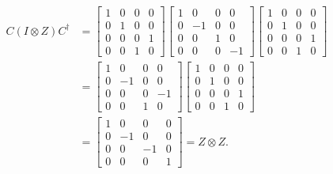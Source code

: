 \documentclass[letterpaper,12pt,oneside,onecolumn]{article}
\begin{document}
\begin{align*}C (I \otimes Z) C^\dagger &=  \begin{bmatrix} 1 & 0 & 0 & 0 \\ 0 & 1 & 0 & 0 \\ 0 & 0 & 0 &1 \\ 0& 0& 1 & 0 \end{bmatrix}\begin{bmatrix}1 &0 &0 &0 \\ 0 & -1 & 0 &0 \\ 0 & 0 &1 & 0\\ 0& 0& 0 & -1 \end{bmatrix} \begin{bmatrix} 1 & 0 & 0 & 0 \\ 0 & 1 & 0 & 0 \\ 0 & 0 & 0 &1 \\ 0& 0& 1 & 0 \end{bmatrix}\\
 &=  \begin{bmatrix} 1 & 0 & 0 &0 \\ 0 & -1 & 0 &0 \\ 0 & 0 & 0 & -1 \\ 0 &0 &1 & 0\end{bmatrix}\begin{bmatrix} 1 & 0 & 0 & 0 \\ 0 & 1 & 0 & 0 \\ 0 & 0 & 0 &1 \\ 0& 0& 1 & 0 \end{bmatrix}\\ &= \begin{bmatrix} 1 & 0 &0 &0 \\ 0 & -1 &0 &0 \\ 0 &0 &-1 & 0\\ 0 &0 &0 &1\end{bmatrix} = Z \otimes Z.\end{align*}
\end{document}
